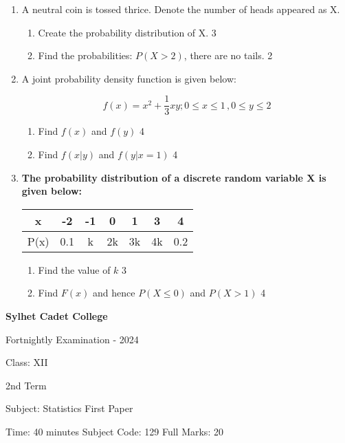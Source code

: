 \documentclass[10pt]{article}
\begin{document}
\begin{enumerate}

\item A neutral coin is tossed thrice. Denote the number of heads appeared as X. 

\begin{enumerate}
\item Create the probability distribution of X. \hfill 3
\item Find the probabilities: $P(X>2)$, there are no tails. \hfill 2
\end{enumerate}

\item A joint probability density function is given below:

\[f(x) = x^2+ \frac13 xy; 0\le x \le 1\,, 0\le y \le 2\]

\begin{enumerate}

\item Find $f(x)$ and $f(y)$ \hfill 4
\item Find $f(x|y)$ and $f(y|x=1)$ \hfill 4

\end{enumerate}

\item \textbf{The probability distribution of a discrete random variable X is given below:} 

	  \begin{table}[h]
	  \begin{center}
\begin{tabular}{c|cccccc}
x    & -2   & -1 & 0   & 1 & 3 & 4   \\ \hline
P(x) & 0.1 & k & 2k & 3k & 4k & 0.2
\end{tabular} 
\end{center}	
\end{table}

\begin{enumerate}

\item Find the value of $k$ \hfill 3
\item Find $F(x)$ and hence $P(X \le 0)$ and $P(X > 1)$ \hfill 4

\end{enumerate}

\end{enumerate}

\vspace{0.5in}


\begin{center}
  \bfseries\large
  Sylhet Cadet College

\normalsize
Fortnightly Examination - 2024

  Class: XII
  
  2nd Term

  Subject: Statistics First Paper

  Time: 40 minutes \qquad \qquad  \qquad \qquad Subject Code: 129  \qquad  \qquad \qquad  \qquad Full Marks: 20

\end{center}
\end{document}
